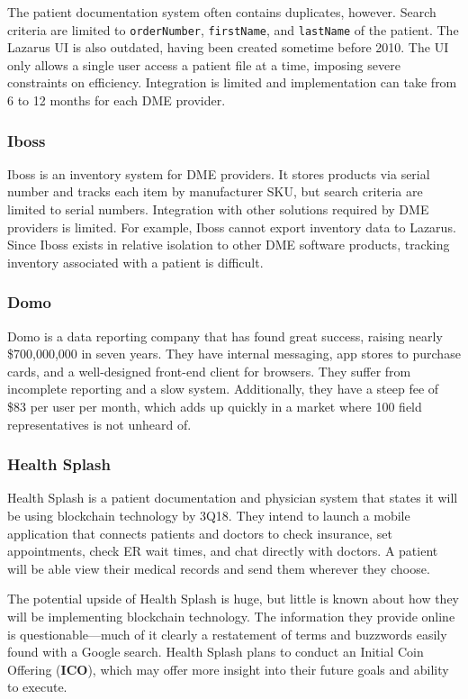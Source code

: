  The patient documentation system often contains duplicates, however. Search criteria are limited to \texttt{orderNumber}, \texttt{firstName}, and \texttt{lastName} of the patient. The Lazarus UI is also outdated, having been created sometime before 2010. The UI only allows a single user access a patient file at a time, imposing severe constraints on efficiency. Integration is limited and implementation can take from 6 to 12 months for each DME provider.%

  \subsubsection{Iboss}
  Iboss is an inventory system for DME providers. It stores products via serial number and tracks each item by manufacturer SKU, but search criteria are limited to serial numbers. Integration with other solutions required by DME providers is limited. For example, Iboss cannot export inventory data to Lazarus. Since Iboss exists in relative isolation to other DME software products, tracking inventory associated with a patient is difficult.%

  \subsubsection{Domo}
  Domo is a data reporting company that has found great success, raising nearly \$700,000,000 in seven years. They have internal messaging, app stores to purchase cards, and a well-designed front-end client for browsers. They suffer from incomplete reporting and a slow system. Additionally, they have a steep fee of \$83 per user per month, which adds up quickly in a market where 100 field representatives is not unheard of.%

  \subsubsection{Health Splash}
  Health Splash is a patient documentation and physician system that states it will be using blockchain technology by 3Q18. They intend to launch a mobile application that connects patients and doctors to check insurance, set appointments, check ER wait times, and chat directly with doctors. A patient will be able view their medical records and send them wherever they choose.%

  The potential upside of Health Splash is huge, but little is known about how they will be implementing blockchain technology. The information they provide online is questionable---much of it clearly a restatement of terms and buzzwords easily found with a Google search. Health Splash plans to conduct an Initial Coin Offering (\textbf{ICO}), which may offer more insight into their future goals and ability to execute.%


